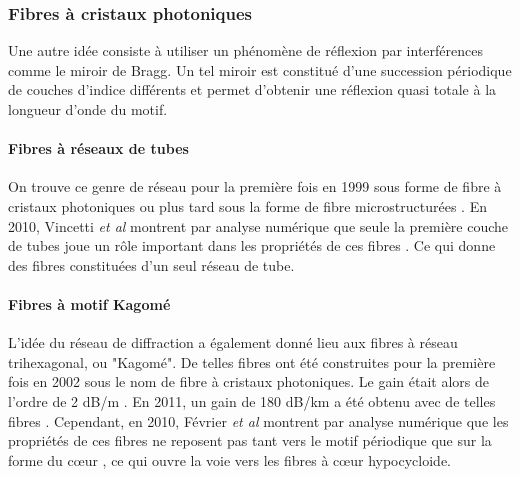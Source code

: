 \subsubsection{Fibres à cristaux photoniques}

Une autre idée consiste à utiliser un phénomène de réflexion par interférences comme le miroir de Bragg. Un tel miroir est constitué d'une succession périodique de couches d'indice différents et permet d'obtenir une réflexion quasi totale à la longueur d'onde du motif. 

\paragraph{Fibres à réseaux de tubes}
On trouve ce genre de réseau pour la première fois en 1999 sous forme de fibre à cristaux photoniques \cite{cregan_single-mode_1999} ou plus tard sous la forme de fibre microstructurées \cite{argyros_hollow-core_2006}. En 2010, Vincetti \emph{et al} montrent par analyse numérique que seule la première couche de tubes joue un rôle important dans les propriétés de ces fibres \cite{vincetti_waveguiding_2010}. Ce qui donne des fibres constituées d'un seul réseau de tube.

\paragraph{Fibres à motif Kagomé}
L'idée du réseau de diffraction a également donné lieu aux fibres à réseau trihexagonal, ou "Kagomé". De telles fibres ont été construites pour la première fois en 2002 sous le nom de fibre à cristaux photoniques. Le gain était alors de l'ordre de 2 dB/m \cite{benabid_stimulated_2002}. En 2011, un gain de 180 dB/km a été obtenu avec de telles fibres \cite{wang_low_2011}.
Cependant, en 2010, Février \emph{et al} montrent par analyse numérique que les propriétés de ces fibres ne reposent pas tant vers le motif périodique que sur la forme du cœur \cite{fevrier_understanding_2010}, ce qui ouvre la voie vers les fibres à cœur hypocycloide. 


